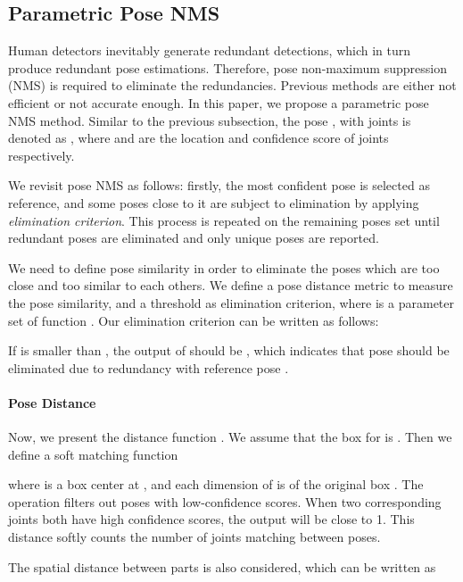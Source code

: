 \documentclass[10pt,twocolumn,letterpaper]{article}
\begin{document}
\subsection{Parametric Pose NMS}
Human detectors inevitably generate redundant detections, which in turn produce redundant pose estimations. Therefore, pose non-maximum suppression (NMS) is required to eliminate the redundancies. Previous methods \cite{burgos2013merging,chen2015parsing} are either not efficient or not accurate enough. In this paper, we propose a parametric pose NMS method. Similar to the previous subsection, the pose  , with  joints is denoted as , where  and  are the  location and confidence score of joints respectively.

\vspace{2mm}
 We revisit pose NMS as follows: firstly, the most confident pose is selected as reference, and some poses close to it are subject to elimination by applying \emph{elimination criterion}. This process is repeated on the remaining poses set until redundant poses are eliminated and only unique poses are reported.

\vspace{2mm}
  We need to define pose similarity in order to eliminate the poses which are too close and too similar to each others. We define a pose distance metric  to measure the pose similarity, and a threshold  as elimination criterion, where  is a parameter set of function . Our elimination criterion can be written as follows:

If  is smaller than , the output of   should be , which indicates that pose  should be eliminated due to redundancy with reference pose .


\paragraph{Pose Distance} Now, we present the distance function . We assume that the box for  is . Then we define a soft matching function

where  is a box center at , and each dimension of  is  of the original box . The  operation filters out poses with low-confidence scores. When two corresponding joints both have high confidence scores, the output will be close to 1. This distance softly counts the number of joints matching between poses.

The spatial distance between parts is also considered, which can be written as
\end{document}
